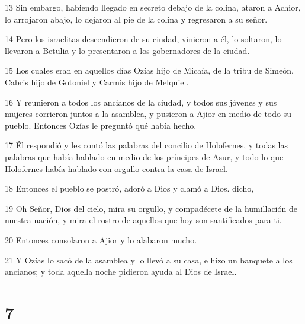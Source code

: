 \par 13 Sin embargo, habiendo llegado en secreto debajo de la colina, ataron a Achior, lo arrojaron abajo, lo dejaron al pie de la colina y regresaron a su señor.
\par 14 Pero los israelitas descendieron de su ciudad, vinieron a él, lo soltaron, lo llevaron a Betulia y lo presentaron a los gobernadores de la ciudad.
\par 15 Los cuales eran en aquellos días Ozías hijo de Micaía, de la tribu de Simeón, Cabris hijo de Gotoniel y Carmis hijo de Melquiel.
\par 16 Y reunieron a todos los ancianos de la ciudad, y todos sus jóvenes y sus mujeres corrieron juntos a la asamblea, y pusieron a Ajior en medio de todo su pueblo. Entonces Ozías le preguntó qué había hecho.
\par 17 Él respondió y les contó las palabras del concilio de Holofernes, y todas las palabras que había hablado en medio de los príncipes de Asur, y todo lo que Holofernes había hablado con orgullo contra la casa de Israel.
\par 18 Entonces el pueblo se postró, adoró a Dios y clamó a Dios. dicho,
\par 19 Oh Señor, Dios del cielo, mira su orgullo, y compadécete de la humillación de nuestra nación, y mira el rostro de aquellos que hoy son santificados para ti.
\par 20 Entonces consolaron a Ajior y lo alabaron mucho.
\par 21 Y Ozías lo sacó de la asamblea y lo llevó a su casa, e hizo un banquete a los ancianos; y toda aquella noche pidieron ayuda al Dios de Israel.

\chapter{7}

